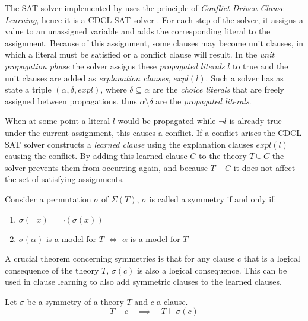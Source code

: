 	The SAT solver implemented by \cite{devriendt2012symmetry} uses the principle of \emph{Conflict Driven Clause Learning}, hence it is a CDCL SAT solver \cite{zhang2001efficient}.
	For each step of the solver, it assigns a value to an unassigned variable and adds the corresponding literal to the assignment.
	Because of this assignment, some clauses may become unit clauses, in which a literal must be satisfied
	or a conflict clause will result.
	In the \emph{unit propagation phase} the solver assigns these \emph{propagated literals} $l$ to true
	and the unit clauses are added as \emph{explanation clauses}, $expl(l)$.
	Such a solver has as state a triple $(\alpha, \delta, expl)$,
	where $\delta\subseteq \alpha$ are the \emph{choice literals} that are freely assigned between propagations,
	thus $\alpha \setminus \delta$ are the \emph{propagated literals}.
	
	When at some point a literal $l$ would be propagated while $\neg l$ is already true under the current assignment, this causes a conflict.
	If a conflict arises the CDCL SAT solver constructs a \emph{learned clause} using the explanation clauses $expl(l)$ causing the conflict.
	By adding this learned clause $C$ to the theory $T \cup C$ the solver prevents them from occurring again,
	and because $T \models C$ it does not affect the set of satisfying assignments.

	Consider a permutation $\sigma$ of $\bar\Sigma(T)$,
	$\sigma$ is called a symmetry if and only if:
	\begin{enumerate}
		\item $\sigma(\neg x) = \neg(\sigma( x ))$
		\item $\sigma(\alpha )$ is a model for $T$ $\Leftrightarrow$ $\alpha$ is a model for $T$
	\end{enumerate}

	A crucial theorem concerning symmetries is that for any clause $c$ that is a logical consequence of the theory $T$,
	$\sigma(c)$ is also a logical consequence.
	This can be used in clause learning to also add symmetric clauses to the learned clauses.\\

	\begin{proposition}
		\label{prop:symmetric_clause_learning}
		Let $\sigma$ be a symmetry of a theory $T$ and $c$ a clause.
		\begin{equation}
			T \models c \quad \implies \quad T \models \sigma( c )
		\end{equation}
	\end{proposition}

